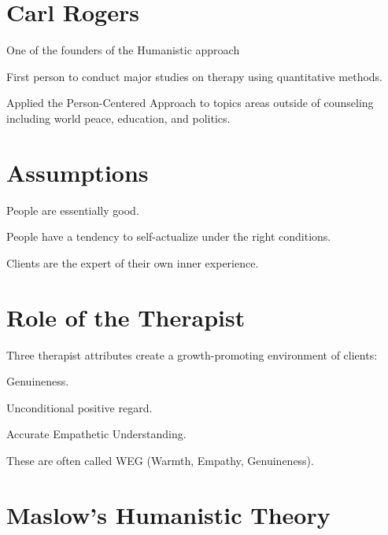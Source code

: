 \section{Carl Rogers}

\begin{coloredlist}
    \item One of the founders of the Humanistic approach
    \item First person to conduct major studies on therapy using quantitative methods.
    \item Applied the Person-Centered Approach to topics areas outside of counseling including world peace, education, and politics.
\end{coloredlist}

\section{Assumptions}

\begin{coloredlist}
    \item People are essentially good.
    \item People have a tendency to self-actualize under the right conditions.
    \item Clients are the expert of their own inner experience.
\end{coloredlist}

\section{Role of the Therapist}

\begin{coloredlist}
    \item Three therapist attributes create a growth-promoting environment of clients:
    \begin{coloredlist}
        \item Genuineness.
        \item Unconditional positive regard.
        \item Accurate Empathetic Understanding.
        \item These are often called WEG (Warmth, Empathy, Genuineness).
    \end{coloredlist}
\end{coloredlist}

\section{Maslow's Humanistic Theory}

